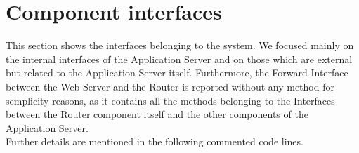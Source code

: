 \documentclass[../../DD.tex]{subfiles}
\begin{document}
\section{Component interfaces\label{sect:2.5}}

This section shows the interfaces belonging to the system. We focused mainly on the internal interfaces of the Application Server and on those which are external but related to the Application Server itself.
Furthermore, the Forward Interface between the Web Server and the Router is reported without any method for semplicity reasons, as it contains all the methods belonging to the Interfaces between the Router component itself and the other components of the Application Server.\\
Further details are mentioned in the following commented code lines.\\
\end{document}
